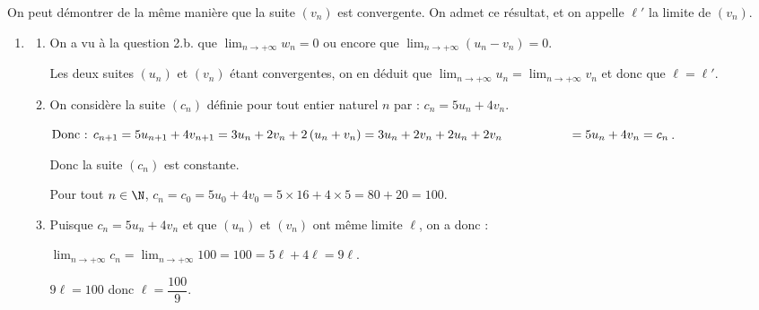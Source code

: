 On peut démontrer de la même manière que la suite $\left(v_n\right)$ est convergente. On admet ce résultat, et on appelle $\ell'$ la limite de $\left(v_n\right)$.
\begin{enumerate}[resume]
\item 
	\begin{enumerate}
		\item %
		On a vu à la question 2.b. que $\displaystyle\lim_{n \to + \infty} w_n = 0$ ou encore que $\displaystyle\lim_{n \to + \infty}\left ( u_n - v_n\right ) = 0$.
		
Les deux suites $(u_n)$ et $(v_n)$ étant convergentes, on en déduit que
$\displaystyle\lim_{n \to + \infty} u_n  = \lim_{n \to + \infty} v_n $		
		 et donc que  $\ell = \ell'$.
		\item On considère la suite $\left(c_n\right)$ définie pour tout entier naturel $n$ par : $c_n = 5u_n + 4v_n$.
		

$\text{Donc : }c_{n+1} = 5u_{n+1} + 4v_{n+1} = 3u_n + 2v_n + 2\left(u_n  + v_n \right) = 3u_n + 2v_n + 2u_n  + 2v_n \\
\phantom{\text{Donc : }c_{n+1}}= 5u_n + 4v_n = c_n$. 

Donc la suite  $\left(c_n\right)$ est constante.

Pour tout $n\in\N$,  $c_n = c_0 = 5u_0 + 4v_0 = 5 \times 16 + 4 \times 5 = 80 + 20 = 100$.
		\item %
Puisque $c_n = 5u_n + 4v_n$ et que $\left(u_n\right)$ et $\left(v_n\right)$ ont même limite $\ell$, on a donc :

$\displaystyle\lim_{n \to + \infty}c_n = \displaystyle\lim_{n \to + \infty}100 = 100 = 5\ell + 4\ell = 9\ell$.

$9\ell = 100$ donc $\ell = \dfrac{100}{9}$.
	\end{enumerate}
\end{enumerate}

\bigskip

